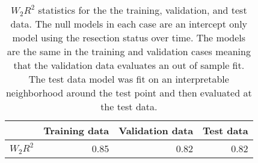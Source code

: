 \begin{table}[ht]
\centering
\begin{tabular}{rrrr}
  \hline
 & Training data & Validation data & Test data \\ 
  \hline
$W_2 R^2$ & 0.85 & 0.82 & 0.82 \\ 
   \hline
\end{tabular}
\caption{$W_2 R^2$ statistics for the the training, validation, and test data.
             The null models in each case are an intercept only model using the resection status
             over time. The models are the same in the training and validation cases meaning that
             the validation data evaluates an out of sample fit. The test data model was
             fit on an interpretable neighborhood around the test point and then evaluated
             at the test data.} 
\end{table}
